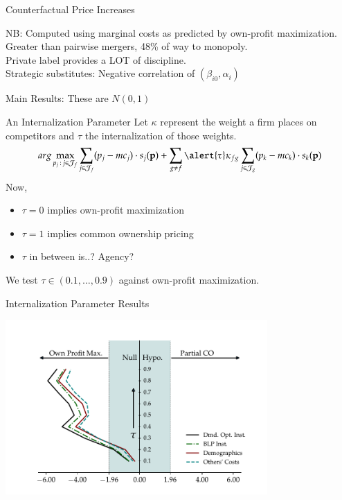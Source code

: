 \documentclass[handout, serif, aspectratio=169, 10pt]{beamer}
\begin{document}
\begin{frame}[plain, label=merger]{Counterfactual Price Increases}
\begin{center}
\scalebox{0.75}{

}
\end{center}
\vspace{1cm}
NB: Computed using marginal costs as predicted by own-profit maximization.\\
Greater than pairwise mergers, 48\% of way to monopoly.\\
Private label provides a LOT of discipline.\\
Strategic substitutes: Negative correlation of $(\beta_{i0}, \alpha_{i})$
\end{frame}


\begin{frame}[plain,label=mainresults]{Main Results: These are $N(0,1)$}
\begin{center}
\scalebox{0.5}{}
\end{center}
\end{frame}

\begin{frame}[plain]{An Internalization Parameter}
Let $\kappa$ represent the weight a firm places on competitors and $\tau$ the internalization of those weights.
 \begin{equation*}
 arg\max_{p_j \,:\, j \in \mathcal{J}_f} \sum_{j \in \mathcal{J}_f} (p_j - mc_j) \cdot s_j(\mathbf{p})+
 \sum_{g\neq f} \alert{\tau} \kappa_{fg} \sum_{j \in \mathcal{J}_g} (p_k - mc_k) \cdot s_k(\mathbf{p})
 \end{equation*}
Now, 
\begin{itemize}
\item $\tau = 0$ implies own-profit maximization
\item $\tau = 1$ implies common ownership pricing
\item $\tau$ in between is..? Agency?
\end{itemize}
We test $\tau \in (0.1, \ldots, 0.9)$ against own-profit maximization.
\end{frame}

\begin{frame}[plain]{Internalization Parameter Results}
\begin{center}
\includegraphics[width=10cm]{figures/tau_figure2.pdf}
\end{center}
\end{frame}
\end{document}
